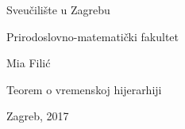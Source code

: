 \begin{center}
\thispagestyle{empty}
{\Large Sveučilište u Zagrebu}
\par\end{center}{\Large \par}

\begin{center}
{\Large Prirodoslovno-matematički fakultet}
\par\end{center}{\Large \par}

\smallskip{}

\vfill{}

\begin{center}
\Large Mia Filić
\par\end{center}{\Large \par}

\medskip{}


\begin{center}
\LARGE 
Teorem o vremenskoj hijerarhiji
\par\end{center}{\huge \par}

\bigskip{}

\vfill{}
Zagreb, 2017
\newpage

\thispagestyle{empty}
